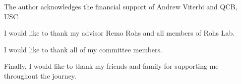 The author acknowledges the financial support of Andrew Viterbi and QCB, USC.

I would like to thank my advisor Remo Rohs and all members of Rohs Lab.

I would like to thank all of my committee members. 

Finally, I would like to thank my friends and family for supporting me throughout the journey.
